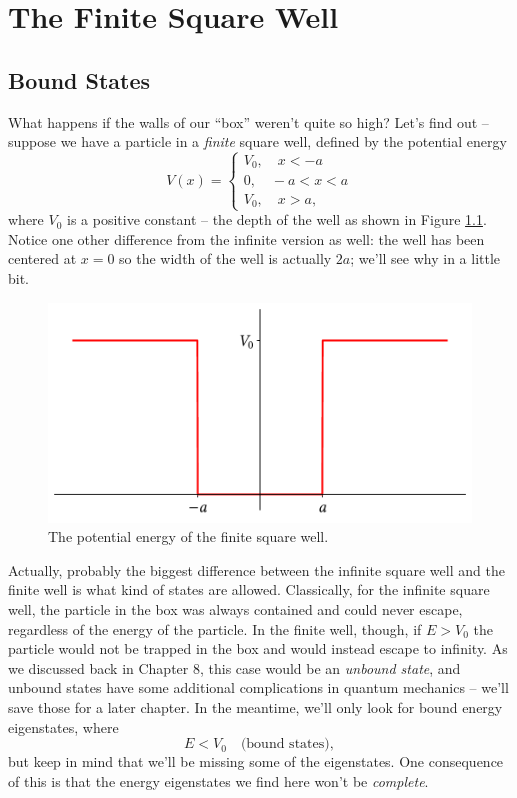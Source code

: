 \chapter{The Finite Square Well}

\section{Bound States}

What happens if the walls of our ``box'' weren't quite so high?  Let's find out -- suppose we have a particle in a \emph{finite} square well, defined by the potential energy
\begin{equation}
V(x) = \begin{cases}
V_0, \quad x<-a \\
0, \quad -a<x<a \\
V_0, \quad x>a,
\end{cases}
\end{equation}
where $V_0$ is a positive constant -- the depth of the well as shown in Figure \ref{fig_finite_sqr_well_potential}.  Notice one other difference from the infinite version as well: the well has been centered at $x=0$ so the width of the well is actually $2a$; we'll see why in a little bit. 

\begin{figure}
\centering\includegraphics[width=0.7\linewidth]{Figures/Chapter 10/fig_finite_sqr_well_potential.pdf}
\caption{The potential energy of the finite square well.}
\label{fig_finite_sqr_well_potential}
\end{figure}

Actually, probably the biggest difference between the infinite square well and the finite well is what kind of states are allowed.  Classically, for the infinite square well, the particle in the box was always contained and could never escape, regardless of the energy of the particle.  In the finite well, though, if $E>V_0$ the particle would not be trapped in the box and would instead escape to infinity.  As we discussed back in Chapter 8, this case would be an \emph{unbound state}, and unbound states have some additional complications in quantum mechanics -- we'll save those for a later chapter.  In the meantime, we'll only look for bound energy eigenstates, where
\[
E < V_0 \quad \text{(bound states)},
\]
but keep in mind that we'll be missing some of the eigenstates.  One consequence of this is that the energy eigenstates we find here won't be \emph{complete}.

